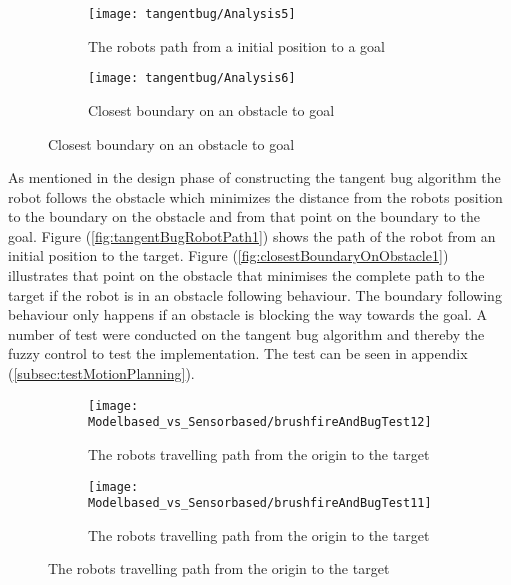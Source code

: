 \documentclass[../Head/Main.tex]{subfiles}
\begin{document}
  \begin{figure}[H]
  \begin{subfigure}[b]{0.59\textwidth}
    \centering
    \texttt{[image: tangentbug/Analysis5]}
    \caption{The robots path from a initial position to a goal}
    \label{fig:tangentBugRobotPath3}
  \end{subfigure}
  \hfill
   \begin{subfigure}[b]{0.39\textwidth}
    \centering
    \texttt{[image: tangentbug/Analysis6]}
    \caption{Closest boundary on an obstacle to goal}
    \label{fig:closestBoundaryOnObstacle3}
  \end{subfigure}
\end{figure}
  
As mentioned in the design phase of constructing the tangent bug algorithm the robot follows the obstacle which minimizes the distance from the robots position to the boundary on the obstacle and from that point on the boundary to the goal. Figure (\ref{fig:tangentBugRobotPath1}) shows the path of the robot from an initial position to the target. Figure (\ref{fig:closestBoundaryOnObstacle1}) illustrates that point on the obstacle that minimises the complete path to the target if the robot is in an obstacle following behaviour. The boundary following behaviour only happens if an obstacle is blocking the way towards the goal. A number of test were conducted on the tangent bug algorithm and thereby the fuzzy control to test the implementation. The test can be seen in appendix (\ref{subsec:testMotionPlanning}).   

\begin{figure}[H]
	\begin{subfigure}[b]{0.49\textwidth}
    	\centering
    	\texttt{[image: Modelbased\_vs\_Sensorbased/brushfireAndBugTest12]}
    	\caption{The robots travelling path from the origin to the target}
    	\label{fig:tangentBugAnalyseTest1}
  	\end{subfigure}
    \hfill
   	\begin{subfigure}[b]{0.49\textwidth}
    	\centering
    	\texttt{[image: Modelbased\_vs\_Sensorbased/brushfireAndBugTest11]}
    	\caption{The robots travelling path from the origin to the target}
    	\label{fig:tangentBugAnalyseTest2}
  	\end{subfigure}
\end{figure}
  
\end{document}
